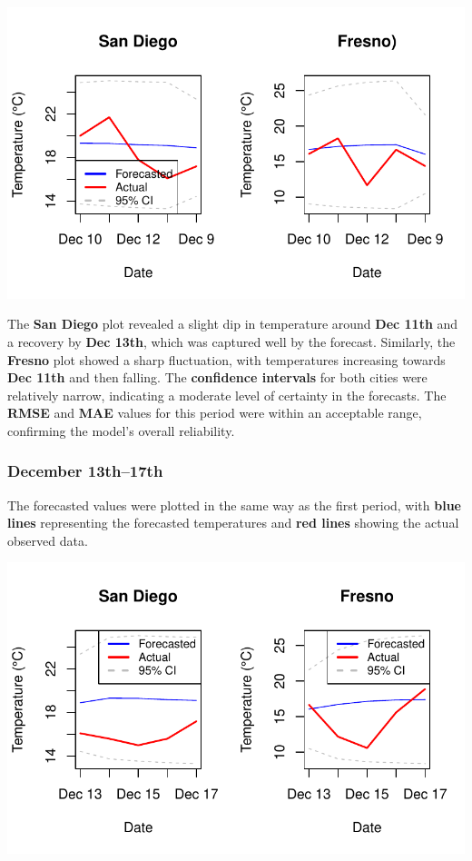 \documentclass[
  11pt,
]{article}
\begin{document}
\includegraphics{project_files/figure-pdf/unnamed-chunk-91-1.pdf}

The \textbf{San Diego} plot revealed a slight dip in temperature around
\textbf{Dec 11th} and a recovery by \textbf{Dec 13th}, which was
captured well by the forecast. Similarly, the \textbf{Fresno} plot
showed a sharp fluctuation, with temperatures increasing towards
\textbf{Dec 11th} and then falling. The \textbf{confidence intervals}
for both cities were relatively narrow, indicating a moderate level of
certainty in the forecasts. The \textbf{RMSE} and \textbf{MAE} values
for this period were within an acceptable range, confirming the model's
overall reliability.

\subsubsection{December 13th--17th}\label{december-13th17th}

The forecasted values were plotted in the same way as the first period,
with \textbf{blue lines} representing the forecasted temperatures and
\textbf{red lines} showing the actual observed data.

\includegraphics{project_files/figure-pdf/unnamed-chunk-92-1.pdf}
\end{document}
